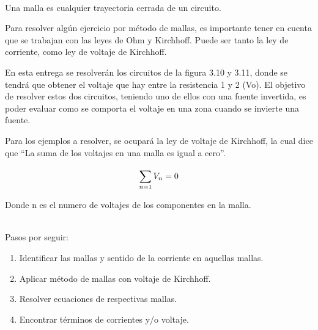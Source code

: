     \newpage
    \begin{example}
        \\


        Una malla es cualquier trayectoria cerrada de un circuito.

        Para resolver algún ejercicio por método de mallas, es importante tener en cuenta que se trabajan con las leyes de Ohm y Kirchhoff. Puede ser tanto la ley de corriente, como ley de voltaje de Kirchhoff.
        \iffalse
            \begin{figure}[H]
                \centering
                \begin{subfigure}{\textwidth}
                    \texttt{[image: SinFuenteinvertida.PNG]}
                    \caption{Ejemplo a resolver sin invertir una fuente}
                    \label{fig:Imagen1}
                \end{subfigure}

                \begin{subfigure}{\textwidth}
                    \texttt{[image: ConFuenteinvertida.PNG]}
                    \caption{Ejemplo a resolver con una fuente invertida}
                    \label{fig:Imagen2}
                \end{subfigure}

            \end{figure}
        \fi
        En esta entrega se resolverán los circuitos de la figura 3.10 y 3.11, donde se tendrá que obtener el voltaje que hay entre la resistencia 1 y 2 (Vo). El objetivo de resolver estos dos circuitos, teniendo uno de ellos con una fuente invertida, es poder evaluar como se comporta el voltaje en una zona cuando se invierte una fuente.


        Para los ejemplos a resolver, se ocupará la ley de voltaje de Kirchhoff, la cual dice que “La suma de los voltajes en una malla es igual a cero”.

        \begin{equation*}
        \notag
        \displaystyle\sum_{n=1}^{} V_n=0
        \end{equation*}
        \begin{center}
            Donde n es el numero de voltajes de los componentes en la malla.
        \end{center}
        \\
        Pasos por seguir:
        \begin{enumerate}
            \item Identificar las mallas y sentido de la corriente en aquellas mallas.
            \item Aplicar método de mallas con voltaje de Kirchhoff.
            \item Resolver ecuaciones de respectivas mallas.
            \item Encontrar términos de corrientes y/o voltaje.


\end{enumerate}
\end{example}
